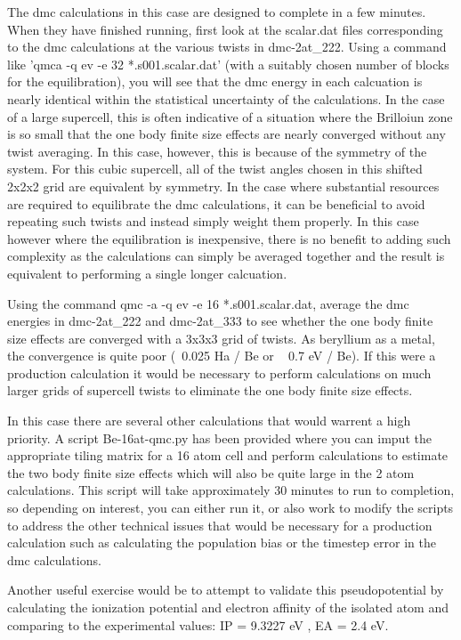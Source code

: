 The dmc calculations in this case are designed to complete in a few minutes.  When they have finished running, first look at the scalar.dat files corresponding to the dmc calculations at the various twists in dmc-2at\_222.  Using a command like 'qmca -q ev -e 32 *.s001.scalar.dat' (with a suitably chosen number of blocks for the equilibration), you will see that the dmc energy in each calcuation is nearly identical within the statistical uncertainty of the calculations.  In the case of a large supercell, this is often indicative of a situation where the Brilloiun zone is so small that the one body finite size effects are nearly converged without any twist averaging.  In this case, however, this is because of the symmetry of the system.  For this cubic supercell, all of the twist angles chosen in this shifted 2x2x2 grid are equivalent by symmetry.  In the case where substantial resources are required to equilibrate the dmc calculations, it can be beneficial to avoid repeating such twists and instead simply weight them properly.  In this case however where the equilibration is inexpensive, there is no benefit to adding such complexity as the calculations can simply be averaged together and the result is equivalent to performing a single longer calcuation.

Using the command qmc -a -q ev -e 16 *.s001.scalar.dat, average the dmc energies in dmc-2at\_222 and dmc-2at\_333 to see whether the one body finite size effects are converged with a 3x3x3 grid of twists.  As beryllium as a metal, the convergence is quite poor (~0.025 Ha / Be or ~ 0.7 eV / Be).  If this were a production calculation it would be necessary to perform calculations on much larger grids of supercell twists to eliminate the one body finite size effects.

In this case there are several other calculations that would warrent a high priority.  A script Be-16at-qmc.py has been provided where you can imput the appropriate tiling matrix for a 16 atom cell and perform calculations to estimate the two body finite size effects which will also be quite large in the 2 atom calculations.  This script will take approximately 30 minutes to run to completion, so depending on interest,  you can either run it, or also work to modify the scripts to address the other technical issues that would be necessary for a production calculation such as calculating the population bias or the timestep error in the dmc calculations.  

Another useful exercise would be to attempt to validate this pseudopotential by calculating the ionization potential and electron affinity of the isolated atom and comparing to the experimental values:  IP = 9.3227 eV , EA = 2.4 eV.

